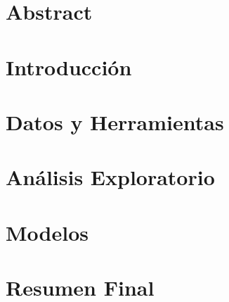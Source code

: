 \documentclass[11pt,a4paper]{especializacion}
\begin{document}

\def\autor{Ignacio José Chiapella}
\def\tituloTesis{Análisis de precios en productos de góndola: \vspace{.2cm} \\ Ciudad de Buenos Aires}
\def\runtitulo{Análisis de precios en productos de góndola: \vspace{.2cm} \\ Ciudad de Buenos Aires}
\def\director{Dr. Ricardo Maronna }
\def\lugar{Buenos Aires, 2021}



\tableofcontents

\chapter{Abstract}


\chapter{Introducción}


\chapter{Datos y Herramientas}


\chapter{Análisis Exploratorio}


\chapter{Modelos}


\chapter{Resumen Final}


%

\printbibliography
\end{document}
